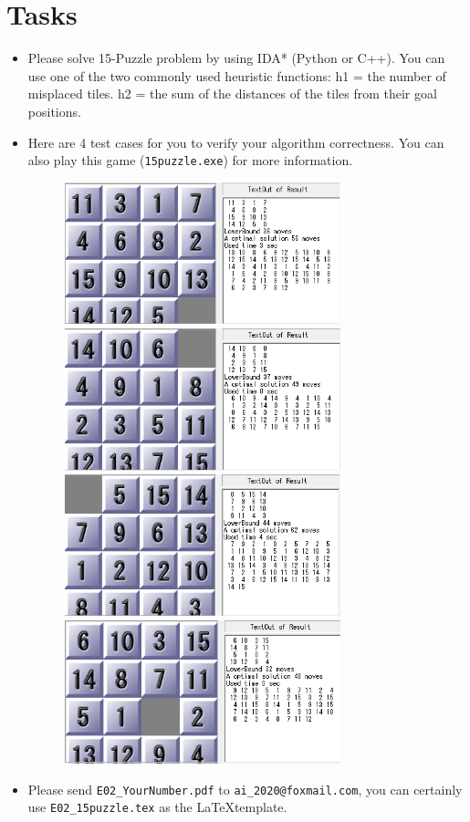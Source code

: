 \documentclass[a4paper, 11pt]{article}
\begin{document}
\section{Tasks}



\begin{itemize}
	\item Please solve 15-Puzzle problem by using IDA* (Python or C++). You can use one of the two commonly used heuristic functions: h1 = the number of misplaced tiles. h2 = the sum of the distances of the tiles from their goal positions.
	\item Here are 4 test cases for you to verify your algorithm correctness. You can also play this game (\texttt{15puzzle.exe}) for more information.
	      \begin{figure}[ht]
		      \centering
		      \includegraphics[width=8cm]{Pic/case1}
		      \quad
		      \includegraphics[width=8cm]{Pic/case2}
		      \\
		      \includegraphics[width=8cm]{Pic/case3}
		      \quad
		      \includegraphics[width=8cm]{Pic/case4}

	      \end{figure}
	\item Please send \texttt{E02\_YourNumber.pdf} to \texttt{ai\_2020@foxmail.com}, you can certainly use \texttt{E02\_15puzzle.tex} as the \LaTeX template.
\end{itemize}
\end{document}
